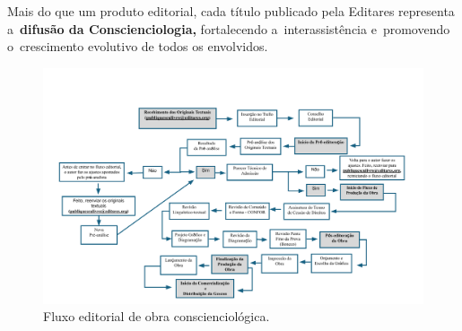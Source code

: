\documentclass{gescons}
\begin{document}
Mais do que um produto editorial, cada título publicado pela Editares representa a~\textbf{difusão da Conscienciologia,} fortalecendo a~interassistência e~promovendo o~crescimento evolutivo de todos os envolvidos.




\begin{figure}[h]
  \centering
  \caption*{Fluxo editorial de obra conscienciológica.} %
  \includegraphics[width=18cm]{articles/resumo/fotos/fluxo-editorial/fluxo-editorial-artigo.png}
\end{figure}


        
\end{document}

